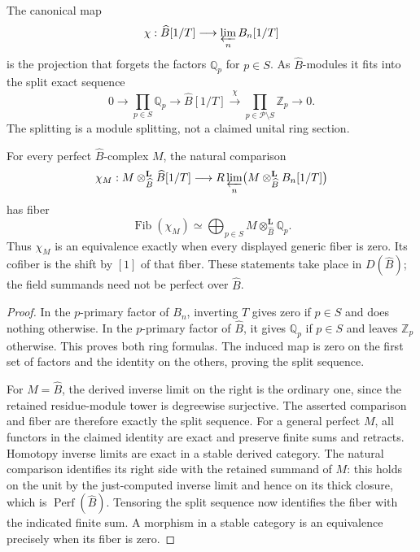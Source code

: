 \begin{theorem}\label{thm:completion-repair-defect}
The canonical map
\[
 \chi:\widehat B[1/T]\longrightarrow\varprojlim_n B_n[1/T]
\]
is the projection that forgets the factors $\mathbb Q_p$ for $p\in S$. As $\widehat B$-modules it fits into the split exact sequence
\[
 0\longrightarrow\prod_{p\in S}\mathbb Q_p
 \longrightarrow\widehat B[1/T]
 \xrightarrow{\chi}\prod_{p\in\mathcal P\setminus S}\mathbb Z_p
 \longrightarrow0.
\]
The splitting is a module splitting, not a claimed unital ring section.

For every perfect $\widehat B$-complex $M$, the natural comparison
\[
 \chi_M:M\otimes^{\mathbf L}_{\widehat B}\widehat B[1/T]
 \longrightarrow R\varprojlim_n
 \bigl(M\otimes^{\mathbf L}_{\widehat B}B_n[1/T]\bigr)
\]
has fiber
\[
 \boxed{\operatorname{Fib}(\chi_M)\simeq
 \bigoplus_{p\in S}M\otimes^{\mathbf L}_{\widehat B}\mathbb Q_p.}
\]
Thus $\chi_M$ is an equivalence exactly when every displayed generic fiber is zero. Its cofiber is the shift by $[1]$ of that fiber. These statements take place in $D(\widehat B)$; the field summands need not be perfect over $\widehat B$.
\end{theorem}
\begin{proof}
In the $p$-primary factor of $B_n$, inverting $T$ gives zero if $p\in S$ and does nothing otherwise. In the $p$-primary factor of $\widehat B$, it gives $\mathbb Q_p$ if $p\in S$ and leaves $\mathbb Z_p$ otherwise. This proves both ring formulas. The induced map is zero on the first set of factors and the identity on the others, proving the split sequence.

For $M=\widehat B$, the derived inverse limit on the right is the ordinary one, since the retained residue-module tower is degreewise surjective. The asserted comparison and fiber are therefore exactly the split sequence. For a general perfect $M$, all functors in the claimed identity are exact and preserve finite sums and retracts. Homotopy inverse limits are exact in a stable derived category. The natural comparison identifies its right side with the retained summand of $M$: this holds on the unit by the just-computed inverse limit and hence on its thick closure, which is $\operatorname{Perf}(\widehat B)$. Tensoring the split sequence now identifies the fiber with the indicated finite sum. A morphism in a stable category is an equivalence precisely when its fiber is zero.
\end{proof}

